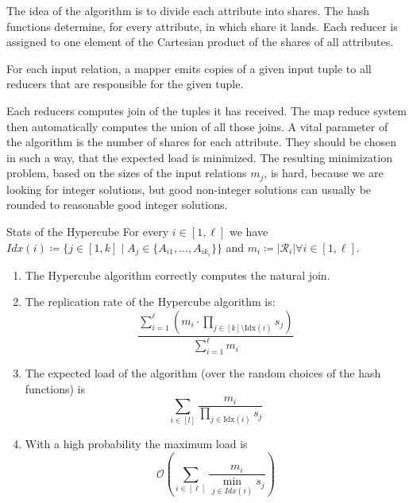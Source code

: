 \documentclass{panikzettel}
\begin{document}
\begin{halfboxl}
\vspace{-\baselineskip}
	The idea of the algorithm is to divide each attribute into shares.
	The hash functions determine, for every attribute, in which share it lands.
	Each reducer is assigned to one element of the Cartesian product of the shares of all attributes.

	For each input relation, a mapper emits copies of a given input tuple to all reducers that are responsible for the given tuple.

	Each reducers computes join of the tuples it has received. The map reduce system then automatically computes the union of all those joins.
	A vital parameter of the algorithm is the number of shares for each attribute. They should be chosen in such a way, that the expected load is minimized.
	The resulting minimization problem, based on the sizes of the input relations $m_j$, is hard, because we are looking for integer solutions, but good non-integer solutions can usually be rounded to reasonable good integer solutions.
\end{halfboxl}
\begin{halfboxr}
\vspace{-\baselineskip}
	\begin{theo}{Stats of the Hypercube}
	For every $i\in[1,\ell]$ we have\\ $Idx(i) \coloneqq \{j\in [1,k] \mid A_j\in \{A_{i1},...,A_{ik_{i}} \} \}$ and $m_i\coloneqq | \mathcal{R}_i| \forall i\in [1,\ell]$.
	\begin{enumerate}[leftmargin=*]
	    \item The Hypercube algorithm correctly computes the natural join.
	    \item The replication rate of the Hypercube algorithm is:
	$$
	\frac{\displaystyle \sum_{i=1}^\ell \left( m_i\cdot \prod_{j \in [k]\setminus \text{Idx}(i)} s_j \right)}{\displaystyle \sum_{i = 1}^\ell m_i }
	$$
		\item The expected load of the algorithm (over the random choices of the hash functions) is
	$$
	\sum_{i \in [l]} \frac{m_i}{\prod_{j \in \text{Idx}(i)} s_j}
	$$
		\item With a high probability the maximum load is
		\[
		\mathcal{O}\left( \sum_{i\in[\ell]} \frac{m_i}{\min_{j\in Idx(i)} s_j} \right)
		\]
	\end{enumerate}
	\end{theo}
\end{halfboxr}
\end{document}
